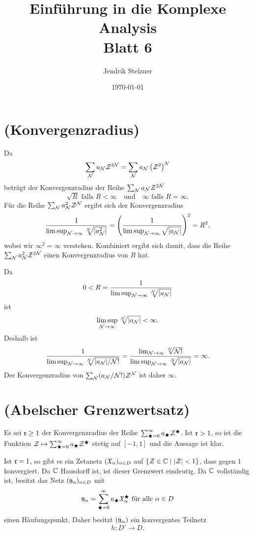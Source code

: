 \documentclass[a4paper,10pt]{article}
\title{Einführung in die Komplexe Analysis \\ \Large Blatt 6}
\author{Jendrik Stelzner}
\date{\today}
\begin{document}
\maketitle





\section{(Konvergenzradius)}
Da
\[
 \sum_{\mathcal{N}} a_{\mathcal{N}} \mathcal{Z}^{2\mathcal{N}}
 = \sum_{\mathcal{N}} a_{\mathcal{N}} \left(\mathcal{Z}^2\right)^{\mathcal{N}}
\]
beträgt der Konvergenzradius der Reihe $\sum_{\mathcal{N}} a_{\mathcal{N}} \mathcal{Z}^{2\mathcal{N}}$
\[
 \sqrt{R} \text{ falls } R < \infty \quad \text{und} \quad \infty \text{ falls } R = \infty.
\]
Für die Reihe $\sum_{\mathcal{N}} a_{\mathcal{N}}^2 \mathcal{Z}^{\mathcal{N}}$ ergibt sich der Konvergenzradius
\[
 \frac{1}{\limsup_{\mathcal{N} \to \infty} \sqrt[\mathcal{N}]{|a_{\mathcal{N}}^2|}}
 = \left( \frac{1}{\limsup_{\mathcal{N} \to \infty} \sqrt{|a_{\mathcal{N}}|}} \right)^2
 = R^2,
\]
wobei wir $\infty^2 = \infty$ verstehen. Kombiniert ergibt sich damit, dass die Reihe $\sum_{\mathcal{N}} a_{\mathcal{N}}^2 \mathcal{Z}^{2\mathcal{N}}$ einen Konvergenzradius von $R$ hat.

Da
\[
 0 < R = \frac{1}{\limsup_{\mathcal{N} \to \infty} \sqrt[\mathcal{N}]{|a_{\mathcal{N}}|}}
\]
ist
\[
 \limsup_{\mathcal{N} \to \infty} \sqrt[\mathcal{N}]{|a_{\mathcal{N}}|} < \infty.
\]
Deshalb ist
\[
 \frac{1}{\limsup_{\mathcal{N} \to \infty} \sqrt[\mathcal{N}]{|a_{\mathcal{N}}|/\mathcal{N}!}}
 = \frac{\lim_{\mathcal{N} \to \infty} \sqrt[\mathcal{N}]{\mathcal{N}!}}{\limsup_{\mathcal{N} \to \infty} \sqrt[\mathcal{N}]{|a_{\mathcal{N}}|}}
 = \infty.
\]
Der Konvergenzradius von $\sum_{\mathcal{N}} (a_{\mathcal{N}}/\mathcal{N}!) \mathcal{Z}^{\mathcal{N}}$ ist daher $\infty$.





\section{(Abelscher Grenzwertsatz)}
Es sei $\mathfrak{r} \geq 1$ der Konvergenzradius der Reihe $\sum_{\bigstar=0}^\infty a_\bigstar \mathcal{Z}^\bigstar$. Ist $\mathfrak{r} > 1$, so ist die Funktion $\mathcal{Z} \mapsto \sum_{\bigstar=0}^\infty a_\bigstar \mathcal{Z}^\bigstar$ stetig auf $[-1,1]$ und die Aussage ist klar.

Ist $\mathfrak{r} = 1$, so gibt es ein Zetanetz $(\mathfrak{X}_\alpha)_{\alpha \in D}$ auf $\{\mathcal{Z} \in \mathbb{C} \mid |\mathcal{Z}| < 1\}$, dass gegen $1$ konvergiert. Da $\mathbb{C}$ Hausdorff ist, ist dieser Grenzwert eindeutig. Da $\mathbb{C}$ vollständig ist, besitzt das Netz $(\mathfrak{y}_\alpha)_{\alpha \in D}$ mit
\[
 \mathfrak{y}_\alpha = \sum_{\bigstar=0}^\infty a_\bigstar \mathfrak{X}_\alpha^\bigstar \text{ für alle } \alpha \in D
\]
einen Häufungspunkt. Daher besitzt $(\mathfrak{y}_\alpha)$ ein konvergentes Teilnetz
\[
 h : D' \to D.
\]
\end{document}
